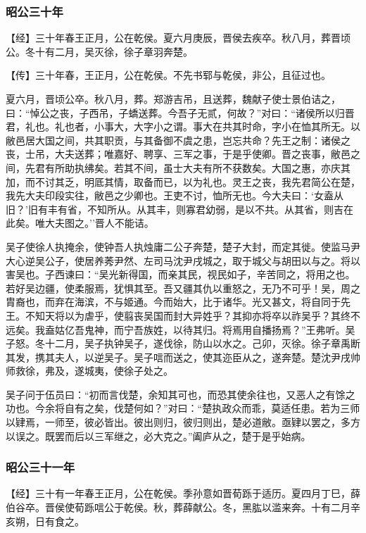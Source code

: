 \documentclass[]{article}
\begin{document}
\hypertarget{header-n2842}{%
\subsubsection{昭公三十年}\label{header-n2842}}

【经】三十年春王正月，公在乾侯。夏六月庚辰，晋侯去疾卒。秋八月，葬晋顷公。冬十有二月，吴灭徐，徐子章羽奔楚。

【传】三十年春，王正月，公在乾侯。不先书郓与乾侯，非公，且征过也。

夏六月，晋顷公卒。秋八月，葬。郑游吉吊，且送葬，魏献子使士景伯诘之，曰：``悼公之丧，子西吊，子蟜送葬。今吾子无贰，何故？''对曰：``诸侯所以归晋君，礼也。礼也者，小事大，大字小之谓。事大在共其时命，字小在恤其所无。以敝邑居大国之间，共其职贡，与其备御不虞之患，岂忘共命？先王之制：诸侯之丧，士吊，大夫送葬；唯嘉好、聘享、三军之事，于是乎使卿。晋之丧事，敝邑之间，先君有所助执绋矣。若其不间，虽士大夫有所不获数矣。大国之惠，亦庆其加，而不讨其乏，明厎其情，取备而已，以为礼也。灵王之丧，我先君简公在楚，我先大夫印段实往，敝邑之少卿也。王吏不讨，恤所无也。今大夫曰：`女盍从旧？'旧有丰有省，不知所从。从其丰，则寡君幼弱，是以不共。从其省，则吉在此矣。唯大夫图之。''晋人不能诘。

吴子使徐人执掩余，使钟吾人执烛庸二公子奔楚，楚子大封，而定其徙。使监马尹大心逆吴公子，使居养莠尹然、左司马沈尹戌城之，取于城父与胡田以与之。将以害吴也。子西谏曰：``吴光新得国，而亲其民，视民如子，辛苦同之，将用之也。若好吴边疆，使柔服焉，犹惧其至。吾又疆其仇以重怒之，无乃不可乎！吴，周之胄裔也，而弃在海滨，不与姬通。今而始大，比于诸华。光又甚文，将自同于先王。不知天将以为虐乎，使翦丧吴国而封大异姓乎？其抑亦将卒以祚吴乎？其终不远矣。我盍姑亿吾鬼神，而宁吾族姓，以待其归。将焉用自播扬焉？''王弗听。吴子怒。冬十二月，吴子执钟吴子，遂伐徐，防山以水之。己卯，灭徐。徐子章禹断其发，携其夫人，以逆吴子。吴子唁而送之，使其迩臣从之，遂奔楚。楚沈尹戌帅师救徐，弗及，遂城夷，使徐子处之。

吴子问于伍员曰：``初而言伐楚，余知其可也，而恐其使余往也，又恶人之有馀之功也。今余将自有之矣，伐楚何如？''对曰：``楚执政众而乖，莫适任患。若为三师以肄焉，一师至，彼必皆出。彼出则归，彼归则出，楚必道敝。亟肄以罢之，多方以误之。既罢而后以三军继之，必大克之。''阖庐从之，楚于是乎始病。

\hypertarget{header-n2850}{%
\subsubsection{昭公三十一年}\label{header-n2850}}

【经】三十有一年春王正月，公在乾侯。季孙意如晋荀跞于适历。夏四月丁巳，薛伯谷卒。晋侯使荀跞唁公于乾侯。秋，葬薛献公。冬，黑肱以滥来奔。十有二月辛亥朔，日有食之。
\end{document}
